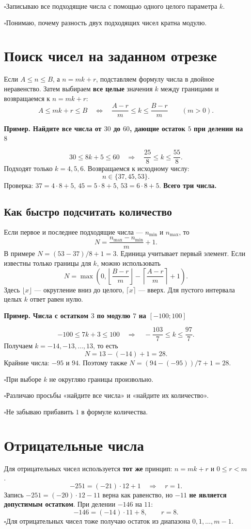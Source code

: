 \documentclass[a4paper,12pt]{article}
\newcommand{\checkitem}[1]{\noindent\textcolor{accent}{\(\square\)}\hspace{0.3em}#1\par}
\newcommand{\ex}[1]{\par\medskip\textcolor{darkaccent}{\textbf{Пример. #1}}\par}
\newcommand{\topic}[1]{\section{#1}}
\begin{document}
\checkitem{Записываю все подходящие числа с помощью одного целого параметра $k$.}
\checkitem{Понимаю, почему разность двух подходящих чисел кратна модулю.}

\topic{Поиск чисел на заданном отрезке}
Если $A\le n\le B$, а $n=mk+r$, подставляем формулу числа в двойное неравенство. Затем выбираем \textbf{все целые} значения $k$ между границами и возвращаемся к $n=mk+r$:
\[
A\le mk+r\le B
\quad\Longleftrightarrow\quad
\boxed{\frac{A-r}{m}\le k\le\frac{B-r}{m}}\qquad(m>0).
\]

\ex{Найдите все числа от $30$ до $60$, дающие остаток $5$ при делении на $8$}
\[
30\le8k+5\le60\quad\Longrightarrow\quad
\frac{25}{8}\le k\le\frac{55}{8}.
\]
Подходят только $k=4,5,6$. Возвращаемся к исходному числу:
\[
\boxed{n\in\{37,45,53\}.}
\]
Проверка: $37=4\cdot8+5$, $45=5\cdot8+5$, $53=6\cdot8+5$. \textbf{Всего три числа.}

\subsection*{Как быстро подсчитать количество}
Если первое и последнее подходящие числа --- $n_{\min}$ и $n_{\max}$, то
\[
\boxed{N=\frac{n_{\max}-n_{\min}}{m}+1.}
\]
В примере $N=(53-37)/8+1=3$. Единица учитывает первый элемент. Если известны только границы для $k$, можно использовать
\[
N=\max\!\left(0,\left\lfloor\frac{B-r}{m}\right\rfloor-
\left\lceil\frac{A-r}{m}\right\rceil+1\right).
\]
Здесь $\lfloor x\rfloor$ --- округление вниз до целого, $\lceil x\rceil$ --- вверх. Для пустого интервала целых $k$ ответ равен нулю.

\ex{Числа с остатком $3$ по модулю $7$ на $[-100;100]$}
\[
-100\le 7k+3\le100
\quad\Longrightarrow\quad
-\frac{103}{7}\le k\le\frac{97}{7}.
\]
Получаем $k=-14,-13,\ldots,13$, то есть
\[
N=13-(-14)+1=\boxed{28}.
\]
Крайние числа: $-95$ и $94$. Поэтому также $N=(94-(-95))/7+1=28$.

\checkitem{При выборе $k$ не округляю границы произвольно.}
\checkitem{Различаю просьбы «найдите все числа» и «найдите их количество».}
\checkitem{Не забываю прибавить $1$ в формуле количества.}

\topic{Отрицательные числа}
Для отрицательных чисел используется \textbf{тот же} принцип: $n=mk+r$ и $0\le r<m$.
\[
\boxed{-251=(-21)\cdot12+1}\quad\Rightarrow\quad r=1.
\]
Запись $-251=(-20)\cdot12-11$ верна как равенство, но $-11$ \textbf{не является допустимым остатком}. При делении $-146$ на $11$:
\[
-146=(-14)\cdot11+8,\qquad \boxed{r=8}.
\]
\checkitem{Для отрицательных чисел тоже получаю остаток из диапазона $0,1,\ldots,m-1$.}
\end{document}
